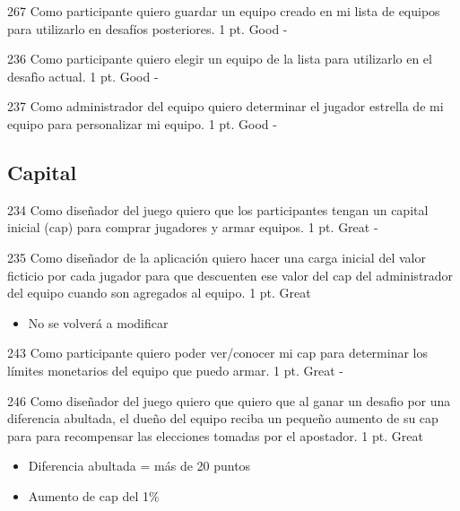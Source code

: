 \vspace{1cm}

\simplestory
{267}
{Como participante quiero guardar un equipo creado en mi lista de equipos para utilizarlo en desafíos posteriores.}
{1 pt.}
{Good}
{-}

\vspace{1cm}

\simplestory
{236}
{Como participante quiero elegir un equipo de la lista para utilizarlo en el desafìo actual.}
{1 pt.}
{Good}
{-}

\vspace{1cm}


\simplestory
{237}
{Como administrador del equipo quiero determinar el jugador estrella de mi equipo para personalizar mi equipo.}
{1 pt.}
{Good}
{-}

\vspace{1cm}



\subsection{Capital}

\simplestory
{234}
{Como diseñador del juego quiero que los participantes tengan un capital inicial (cap) para comprar jugadores y armar equipos.}
{1 pt.}
{Great}
{-}

\vspace{1cm}

\simplestory
{235}
{Como diseñador de la aplicación quiero hacer una carga inicial del valor ficticio por cada jugador para que descuenten ese valor del cap del administrador del equipo cuando son agregados al equipo.}
{1 pt.}
{Great}
{\begin{itemize}
\item No se volverá a modificar
\end{itemize}}

\vspace{1cm}

\simplestory
{243}
{Como participante quiero poder ver/conocer mi cap para determinar los límites monetarios del equipo que puedo armar.}
{1 pt.}
{Great}
{-}

\vspace{1cm}

\simplestory
{246}
{Como diseñador del juego quiero que quiero que al ganar un desafio por una diferencia abultada, el dueño del equipo reciba un pequeño aumento de su cap para para recompensar las elecciones tomadas por el apostador.}
{1 pt.}
{Great}
{\begin{itemize}
\item Diferencia abultada = más de 20 puntos
\item Aumento de cap del 1\%
\end{itemize}}

